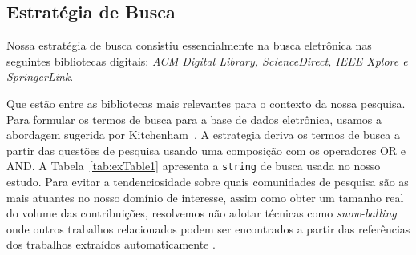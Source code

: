\subsection{Estratégia de Busca}\label{estrategia_busca}
	Nossa estratégia de busca consistiu essencialmente na busca eletrônica nas seguintes bibliotecas digitais: 
\emph{ACM Digital Library, ScienceDirect, IEEE Xplore e SpringerLink}.


\noindent Que estão entre as bibliotecas mais relevantes para o contexto da nossa pesquisa. Para formular os termos de busca para a base de dados eletrônica, usamos a abordagem sugerida por Kitchenham~\cite{kitchenham:techReport2007,budgen:ppig2008}. A estrategia 
deriva os termos de busca a partir das questões de pesquisa usando uma composição com os operadores OR e AND. A  Tabela~\ref{tab:exTable1} apresenta a \texttt{string} de busca usada no nosso estudo. Para evitar a tendenciosidade sobre quais comunidades de pesquisa s\~{a}o as mais atuantes no nosso dom\'{i}nio de interesse, assim como obter um tamanho real do volume das contribuições, resolvemos não adotar técnicas como \emph{snow-balling} onde outros trabalhos relacionados podem ser encontrados a partir das referências dos trabalhos extraídos automaticamente \cite{budgen:ppig2008}.

